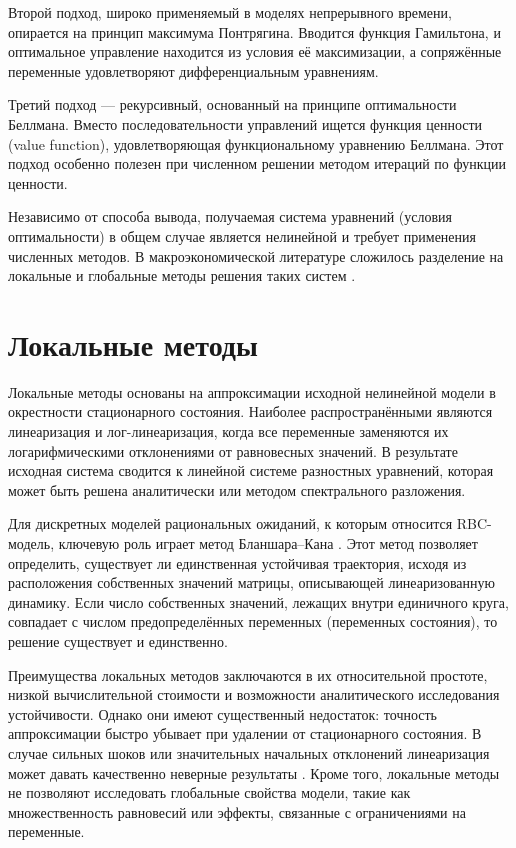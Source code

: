 \documentclass[12pt,a4paper]{report}   %
\begin{document}
            Второй подход, широко применяемый в моделях непрерывного времени, опирается на принцип максимума Понтрягина. Вводится функция Гамильтона, и оптимальное управление находится из условия её максимизации, а сопряжённые переменные удовлетворяют дифференциальным уравнениям.

            Третий подход — рекурсивный, основанный на принципе оптимальности Беллмана. Вместо последовательности управлений ищется функция ценности (value function), удовлетворяющая функциональному уравнению Беллмана. Этот подход особенно полезен при численном решении методом итераций по функции ценности.

            Независимо от способа вывода, получаемая система уравнений (условия оптимальности) в общем случае является нелинейной и требует применения численных методов. В макроэкономической литературе сложилось разделение на локальные и глобальные методы решения таких систем \cite{judd, heermaussner}.

        \section{Локальные методы}

            Локальные методы основаны на аппроксимации исходной нелинейной модели в окрестности стационарного состояния. Наиболее распространёнными являются линеаризация и лог-линеаризация, когда все переменные заменяются их логарифмическими отклонениями от равновесных значений. В результате исходная система сводится к линейной системе разностных уравнений, которая может быть решена аналитически или методом спектрального разложения.

            Для дискретных моделей рациональных ожиданий, к которым относится RBC-модель, ключевую роль играет метод Бланшара--Кана \cite{blanchardkahn}. Этот метод позволяет определить, существует ли единственная устойчивая траектория, исходя из расположения собственных значений матрицы, описывающей линеаризованную динамику. Если число собственных значений, лежащих внутри единичного круга, совпадает с числом предопределённых переменных (переменных состояния), то решение существует и единственно.

            Преимущества локальных методов заключаются в их относительной простоте, низкой вычислительной стоимости и возможности аналитического исследования устойчивости. Однако они имеют существенный недостаток: точность аппроксимации быстро убывает при удалении от стационарного состояния. В случае сильных шоков или значительных начальных отклонений линеаризация может давать качественно неверные результаты \cite{heermaussner}. Кроме того, локальные методы не позволяют исследовать глобальные свойства модели, такие как множественность равновесий или эффекты, связанные с ограничениями на переменные.
        
\end{document}
